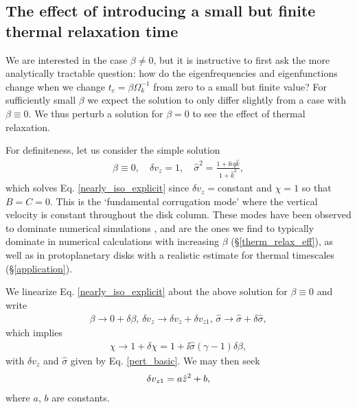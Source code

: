 \subsection{The effect of introducing a small but finite
  thermal relaxation time}\label{relax_pert}
We are interested in the case $\beta\neq 0$, but it is instructive to
first ask  the more analytically tractable question: how 
do the eigenfrequencies and eigenfunctions change when we change
$t_c=\beta\Omega_k^{-1}$ from zero to a small but finite value? For 
sufficiently small $\beta$ we expect the solution to only differ
slightly from a case with $\beta\equiv 0$. We thus perturb a solution
for $\beta=0$ to see the effect of thermal relaxation.  

For definiteness, let us consider the simple solution 
\begin{align}
  \beta\equiv 0, \quad \delta v_z = 1,\quad \hat{\sigma}^2 = \frac{1 +
  \ii\epsilon q \hat{k}}{1+\hat{k}^2}, \label{pert_basic} 
\end{align}
which solves Eq. \ref{nearly_iso_explicit} since $\delta
v_z=$constant and $\chi=1$ so that $B=C=0$. 
This is the `fundamental corrugation mode' where the vertical
velocity is constant throughout the disk column. These modes have been
observed to dominate numerical simulations \citep{nelson13,stoll14},  
and are the ones we find to typically dominate in numerical calculations with 
increasing $\beta$ (\S\ref{therm_relax_eff}), as well as in protoplanetary disks 
with a realistic estimate for thermal timescales
(\S\ref{application}).  

We linearize Eq. \ref{nearly_iso_explicit} about the above
solution for $\beta\equiv0$ and write 
\begin{align}\label{nearly_iso_pert}
  \beta \to 0 + \delta\beta,\, \delta v_z\to \delta v_z+\delta
  v_{z1},\,\hat{\sigma} \to \hat{\sigma} + \delta\hat{\sigma}, 
\end{align}
which implies 
\begin{align}
  \chi \to 1 + \delta\chi = 1 + \ii \hat{\sigma}\left(\gamma-1\right)\delta\beta,
\end{align}
with $\delta v_z$ and $\hat{\sigma}$ given by Eq. \ref{pert_basic}. We
may then seek  
\begin{align}
  \delta v_{z1} = a \hat{z}^2 + b,
\end{align}
where $a$, $b$ are constants. 

